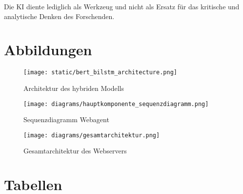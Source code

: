 Die KI diente lediglich als Werkzeug und nicht als Ersatz für das kritische und analytische Denken des Forschenden.

\newpage

\section{Abbildungen}

\begin{figure}[htbp]
    \begin{center}
        \texttt{[image: static/bert\_bilstm\_architecture.png]}
        \caption{\label{fig:bert_bilstm_architecture} Architektur des hybriden Modells \cite{wang2021covid19fakenewsdetection}}
    \end{center}
\end{figure}

\begin{figure}[htbp]
    \begin{center}
        \texttt{[image: diagrams/hauptkomponente\_sequenzdiagramm.png]}
        \caption{\label{fig:seq_hauptkomponente} Sequenzdiagramm Webagent}
    \end{center}
\end{figure}

\begin{figure}[htbp]
    \begin{center}
        \texttt{[image: diagrams/gesamtarchitektur.png]}
        \caption{\label{fig:gesamtarchitektur} Gesamtarchitektur des Webservers}
    \end{center}
\end{figure}

\newpage

\section{Tabellen}

